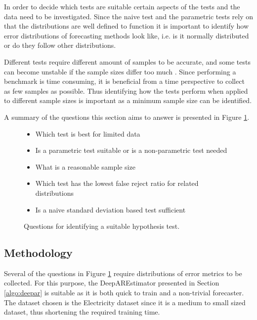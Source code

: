 In order to decide which tests are suitable certain aspects of the tests and the data need to be investigated. Since the naive test and the parametric tests rely on that the distributions are well defined to function it is important to identify how error distributions of forecasting methods look like, i.e. is it normally distributed or do they follow other distributions.

Different tests require different amount of samples to be accurate, and some tests can become unstable if the sample sizes differ too much \cite{hassani2015kolmogorov, student_or_welch}. Since performing a benchmark is time consuming, it is beneficial from a time perspective to collect as few samples as possible. Thus identifying how the tests perform when applied to different sample sizes is important as a minimum sample size can be identified.

A summary of the questions this section aims to answer is presented in Figure \ref{fig:reproducibility_questions}.

\begin{figure}
  \begin{itemize}
    \item Which test is best for limited data
    \item Is a parametric test suitable or is a non-parametric test needed
    \item What is a reasonable sample size
    \item Which test has the lowest false reject ratio for related distributions
    \item Is a naive standard deviation based test sufficient
  \end{itemize}
  \caption{Questions for identifying a suitable hypothesis test.}
  \label{fig:reproducibility_questions}
\end{figure}

\subsection{Methodology}
\label{hypothesis_test_methodology}
Several of the questions in Figure \ref{fig:reproducibility_questions} require distributions of error metrics to be collected. For this purpose, the DeepAREstimator presented in Section \ref{algo:deepar} is suitable as it is both quick to train and a non-trivial forecaster. The dataset chosen is the Electricity dataset since it is a medium to small sized dataset, thus shortening the required training time.

